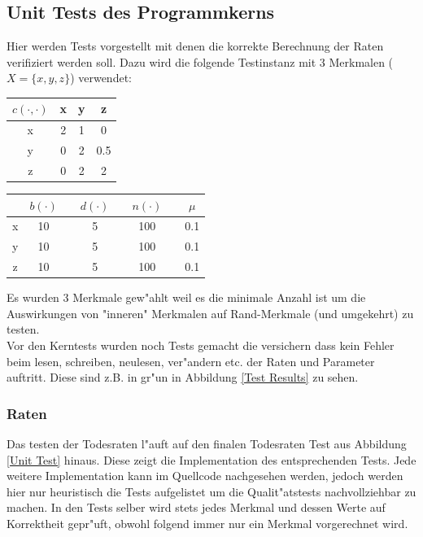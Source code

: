\documentclass[11pt, a4paper, german]{article}
\theoremstyle{plain}
\begin{document}
	\subsection{Unit Tests des Programmkerns}
	Hier werden Tests vorgestellt mit denen die korrekte Berechnung der Raten verifiziert werden soll. Dazu wird die folgende Testinstanz mit 3 Merkmalen ($ X = \{x,y,z\} $) verwendet:\\
	\begin{center}
		\begin{minipage}{0.35 \textwidth}
			\begin{tabular}{ c | c c c }
			 $ c(\cdot, \cdot) $ & x & y & z \\
			 \hline
			 x & 2 & 1 & 0 \\
			 y & 0 & 2 & 0.5 \\
			 z & 0 & 2 & 2 \\
			\end{tabular}
			\end{minipage}
			\begin{minipage}{0.5 \textwidth}
			\begin{tabular}{ c | c  c  c  c  c  c  c }
			 & $ b(\cdot ) $ &  & $ d(\cdot ) $ & & $ n(\cdot ) $ & & $ \mu $\\
			 \hline
			 x & 10 &  & 5 & & 100 & & 0.1\\
			 y & 10 &  & 5 & & 100 & & 0.1\\   
			 z & 10 &  & 5 & & 100 & & 0.1\\
			\end{tabular}
			\end{minipage}
	\end{center}
	Es wurden 3 Merkmale gew"ahlt weil es die minimale Anzahl ist um die Auswirkungen von "{}inneren"{} Merkmalen auf Rand-Merkmale (und umgekehrt) zu testen.\\
	Vor den Kerntests wurden noch Tests gemacht die versichern dass kein Fehler beim lesen, schreiben, neulesen, ver"andern etc. der Raten und Parameter auftritt. Diese sind z.B. in gr"un in Abbildung \ref{Test Results} zu sehen.

	\subsubsection{Raten}
	Das testen der Todesraten l"auft auf den finalen Todesraten Test aus Abbildung \ref{Unit Test} hinaus. Diese zeigt die Implementation des entsprechenden Tests. Jede weitere Implementation kann im Quellcode nachgesehen werden, jedoch werden hier nur heuristisch die Tests aufgelistet um die Qualit"atstests nachvollziehbar zu machen. In den Tests selber wird stets jedes Merkmal und dessen Werte auf Korrektheit gepr"uft, obwohl folgend immer nur ein Merkmal vorgerechnet wird.\\
	
\end{document}
